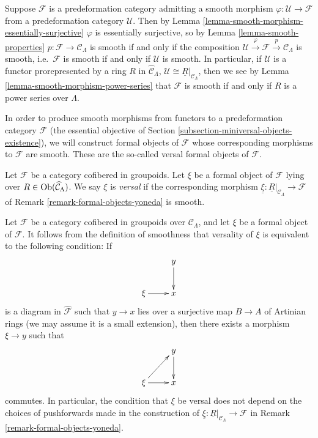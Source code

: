 \begin{remark}
Suppose $\mathcal F$ is a predeformation category admitting a smooth morphism 
$\varphi: \mathcal U \rightarrow \mathcal F$ from a predeformation category 
$\mathcal U$.  Then by Lemma \ref{lemma-smooth-morphism-essentially-surjective} 
$\varphi$ is essentially surjective, so by Lemma \ref{lemma-smooth-properties} 
$p: \mathcal F \rightarrow \mathcal C_{\Lambda}$ is smooth if and only if the 
composition $\mathcal U \xrightarrow{\varphi} \mathcal F \xrightarrow{p} 
\mathcal C_{\Lambda}$ is smooth, i.e.\ $\mathcal F$ is smooth if and only if 
$\mathcal U$ is smooth.  In particular, if $\mathcal U$ is a functor 
prorepresented by a ring $R$ in $\widehat{\mathcal C}_{\Lambda}$, $\mathcal U 
\cong \underline{R}|_{\mathcal C_{\Lambda}}$, then we see by Lemma 
\ref{lemma-smooth-morphism-power-series} that $\mathcal F$ is smooth if and 
only if $R$ is a power series over $\Lambda$.
\end{remark}

\noindent
In order to produce smooth morphisms from functors to a predeformation category 
$\mathcal F$ (the essential objective of Section 
\ref{subsection-miniversal-objects-existence}), we will construct formal 
objects of $\mathcal F$ whose corresponding morphisms to $\mathcal F$ are 
smooth.  These are the so-called versal formal objects of $\mathcal F$.
\begin{definition}
Let $\mathcal F$ be a category cofibered in groupoids.  Let $\xi$ be a formal 
object of $\mathcal F$ lying over $R \in \textnormal{Ob}(\widehat{\mathcal 
C}_{\Lambda})$.  We say $\xi$ is \emph{versal} if the corresponding morphism 
$\underline{\xi}: \underline{R}|_{\mathcal C_{\Lambda}} \rightarrow \mathcal F$ 
of Remark \ref{remark-formal-objects-yoneda} is smooth.
\end{definition}

\begin{remark}
\label{remark-versal-object}
Let $\mathcal F$ be a category cofibered in groupoids over $\mathcal 
C_{\Lambda}$, and let $\xi$ be a formal object of $\mathcal F$.  It follows 
from the definition of smoothness that versality of $\xi$ is equivalent to the 
following condition: If 
\[
\xymatrix{
            &  y \ar[d] \\
\xi \ar[r]  &  x
}
\]
is a diagram in $\widehat{\mathcal F}$ such that $y \rightarrow x$ lies over a 
surjective map $B \rightarrow A$ of Artinian rings (we may assume it is a small 
extension),  then there exists a morphism $\xi \rightarrow y$ such that
\[
\xymatrix{
            &  y \ar[d] \\
\xi \ar[r] \ar[ur]  &  x
}
\] 
commutes. In particular, the condition that $\xi$ be versal does not depend on 
the choices of pushforwards made in the construction of $\underline{\xi}: 
\underline{R}|_{\mathcal C_{\Lambda}} \rightarrow \mathcal F$ in Remark 
\ref{remark-formal-objects-yoneda}.
\end{remark}

